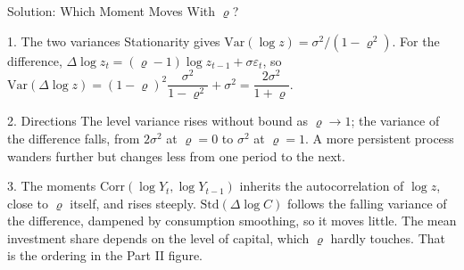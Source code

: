 \documentclass[aspectratio=169,11pt]{beamer}
\newcommand{\emphc}[1]{\textcolor{harvardcrimson}{#1}}
\begin{document}
\begin{frame}{Solution: Which Moment Moves With $\varrho$?}
\small
\begin{block}{1. The two variances}
Stationarity gives $\mathrm{Var}(\log z) = \sigma^2 / (1 - \varrho^2)$. For the difference, $\Delta \log z_t = (\varrho - 1)\log z_{t-1} + \sigma\varepsilon_t$, so
$\mathrm{Var}(\Delta \log z) = (1-\varrho)^2 \dfrac{\sigma^2}{1-\varrho^2} + \sigma^2 = \dfrac{2\sigma^2}{1 + \varrho}$.
\end{block}

\begin{block}{2. Directions}
The level variance \emphc{rises} without bound as $\varrho \to 1$; the variance of the difference \emphc{falls}, from $2\sigma^2$ at $\varrho = 0$ to $\sigma^2$ at $\varrho = 1$. A more persistent process wanders further but changes less from one period to the next.
\end{block}

\begin{block}{3. The moments}
$\mathrm{Corr}(\log Y_t, \log Y_{t-1})$ inherits the autocorrelation of $\log z$, close to $\varrho$ itself, and rises steeply. $\mathrm{Std}(\Delta \log C)$ follows the falling variance of the difference, dampened by consumption smoothing, so it moves little. The mean investment share depends on the level of capital, which $\varrho$ hardly touches. That is the ordering in the Part II figure.
\end{block}
\end{frame}
\end{document}
